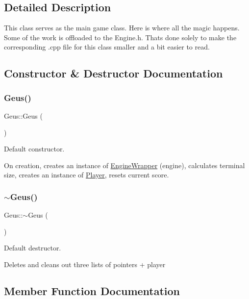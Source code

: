 \subsection{Detailed Description}
This class serves as the main game class. Here is where all the magic happens. Some of the work is offloaded to the Engine.\+h. That\textquotesingle{}s done solely to make the corresponding .cpp file for this class smaller and a bit easier to read. 

\subsection{Constructor \& Destructor Documentation}
\mbox{\label{classGeus_a21852cfcb9229ce95773f15cf1e8620e}} 
\subsubsection{\texorpdfstring{Geus()}{Geus()}}
{\footnotesize\ttfamily Geus\+::\+Geus (\begin{DoxyParamCaption}{ }\end{DoxyParamCaption})}



Default constructor. 

On creation, creates an instance of \hyperlink{classEngineWrapper}{Engine\+Wrapper} (engine), calculates terminal size, creates an instance of \hyperlink{classPlayer}{Player}, resets current score. \mbox{\label{classGeus_ac6a5d703343da401f4af4c9eb89a5ae8}} 
\subsubsection{\texorpdfstring{$\sim$\+Geus()}{~Geus()}}
{\footnotesize\ttfamily Geus\+::$\sim$\+Geus (\begin{DoxyParamCaption}{ }\end{DoxyParamCaption})}



Default destructor. 

Deletes and cleans out three lists of pointers + player 

\subsection{Member Function Documentation}
\mbox{\label{classGeus_a53d54fe777e1eeecbfcd64c852b5322a}} 
